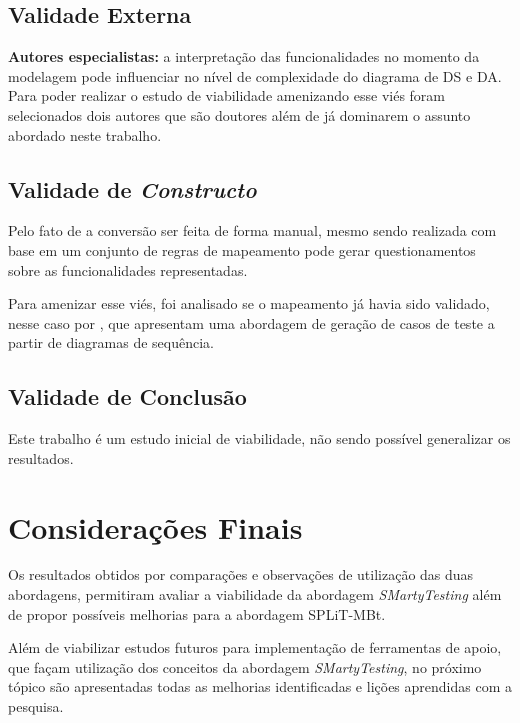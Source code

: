 \subsection{Validade Externa}
\textbf{Autores especialistas:} a interpretação das funcionalidades no momento da modelagem pode influenciar no nível de complexidade do diagrama de DS e DA. Para poder realizar o estudo de viabilidade amenizando esse viés foram selecionados dois autores que são doutores além de já dominarem o assunto abordado neste trabalho. 

\subsection{Validade de \textit{Constructo}}

Pelo fato de a conversão ser feita de forma manual, mesmo sendo realizada com base em um conjunto de regras de mapeamento \cite{garousi2005control} pode gerar questionamentos sobre as funcionalidades representadas. 

Para amenizar esse viés, foi analisado se o mapeamento já havia sido validado, nesse caso por \citet{shafique2010systematic}, que apresentam uma abordagem de geração de casos de teste a partir de diagramas de sequência. 

\subsection{Validade de Conclusão}
Este trabalho é um estudo inicial de viabilidade, não sendo possível generalizar os resultados.

\section{Considerações Finais}
Os resultados obtidos por comparações e observações de utilização das duas abordagens, permitiram avaliar a viabilidade da abordagem \textit{SMartyTesting} além de propor possíveis melhorias para a abordagem SPLiT-MBt.

Além de viabilizar estudos futuros para implementação de ferramentas de apoio, que façam utilização dos conceitos da abordagem \textit{SMartyTesting}, no próximo tópico são apresentadas todas as melhorias identificadas e lições aprendidas com a pesquisa.


